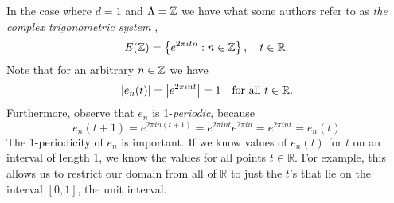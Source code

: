 \documentclass[../thesis.tex]{subfiles}
\begin{document}
\begin{example}
    In the case where $d=1$ and $\Lambda = \mathbb{Z}$ we have what some authors refer to as \emph{the complex trigonometric system} \cite{heilMetricsNormsInner2018} \cite{encyclopediaofmathematicsTrigonometricSystem},
    \begin{align}
        E(\mathbb{Z}) &= \left\{e^{2\pi i t n} : n \in \mathbb{Z}\right\}, \quad t\in \mathbb{R}.\\
    \end{align}
    Note that for an arbitrary $n \in \mathbb{Z}$ we have
    \begin{equation}
        \left|e_{n}(t) \right|= \left|e^{2 \pi i n t}\right| = 1 \quad \text{for all } t\in \mathbb{R}.
    \end{equation}
    Furthermore, observe that $e_n$ is 1-\emph{periodic}, because
    \begin{equation}
        e_n(t+1) = e^{2 \pi i n (t+1)} = e^{2 \pi i n t} e^{2 \pi i n} = e^{2 \pi i n t} = e_n(t)
    \end{equation}
    The 1-periodicity of $e_n$ is important. If we know values of $e_n(t)$ for $t$ on an interval of length $1$, we know the values for all points $t\in \mathbb{R}$. For example, this allows us to restrict our domain from all of $\mathbb{R}$ to just the $t$'s that lie on the interval $[0,1]$, the unit interval. 
\end{example}

\end{document}

